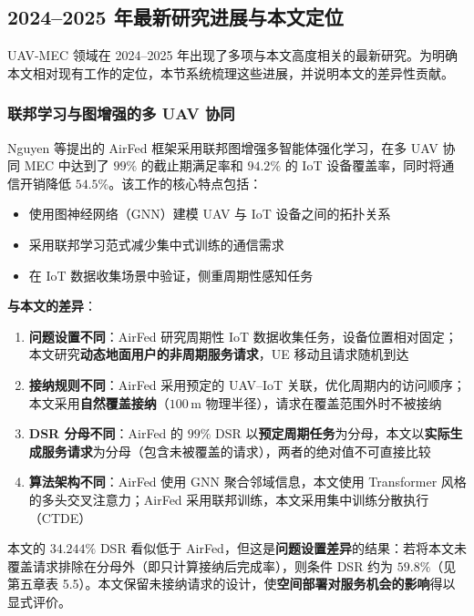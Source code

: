 \subsection{2024--2025 年最新研究进展与本文定位}
\label{sec:ch1-recent-advances}

UAV-MEC 领域在 2024--2025 年出现了多项与本文高度相关的最新研究。为明确本文相对现有工作的定位，本节系统梳理这些进展，并说明本文的差异性贡献。

\subsubsection{联邦学习与图增强的多 UAV 协同}

Nguyen 等提出的 AirFed 框架\cite{nguyen2024airfed}采用联邦图增强多智能体强化学习，在多 UAV 协同 MEC 中达到了 $99\%$ 的截止期满足率和 $94.2\%$ 的 IoT 设备覆盖率，同时将通信开销降低 $54.5\%$。该工作的核心特点包括：
\begin{itemize}
    \item 使用图神经网络（GNN）建模 UAV 与 IoT 设备之间的拓扑关系
    \item 采用联邦学习范式减少集中式训练的通信需求
    \item 在 IoT 数据收集场景中验证，侧重周期性感知任务
\end{itemize}

\textbf{与本文的差异}：
\begin{enumerate}
    \item \textbf{问题设置不同}：AirFed 研究周期性 IoT 数据收集任务，设备位置相对固定；本文研究\textbf{动态地面用户的非周期服务请求}，UE 移动且请求随机到达
    \item \textbf{接纳规则不同}：AirFed 采用预定的 UAV--IoT 关联，优化周期内的访问顺序；本文采用\textbf{自然覆盖接纳}（$100\,\mathrm{m}$ 物理半径），请求在覆盖范围外时不被接纳
    \item \textbf{DSR 分母不同}：AirFed 的 $99\%$ DSR 以\textbf{预定周期任务}为分母，本文以\textbf{实际生成服务请求}为分母（包含未被覆盖的请求），两者的绝对值不可直接比较
    \item \textbf{算法架构不同}：AirFed 使用 GNN 聚合邻域信息，本文使用 Transformer 风格的多头交叉注意力；AirFed 采用联邦训练，本文采用集中训练分散执行（CTDE）
\end{enumerate}

本文的 $34.244\%$ DSR 看似低于 AirFed，但这是\textbf{问题设置差异}的结果：若将本文未覆盖请求排除在分母外（即只计算接纳后完成率），则条件 DSR 约为 $59.8\%$（见第五章表 5.5）。本文保留未接纳请求的设计，使\textbf{空间部署对服务机会的影响}得以显式评价。

